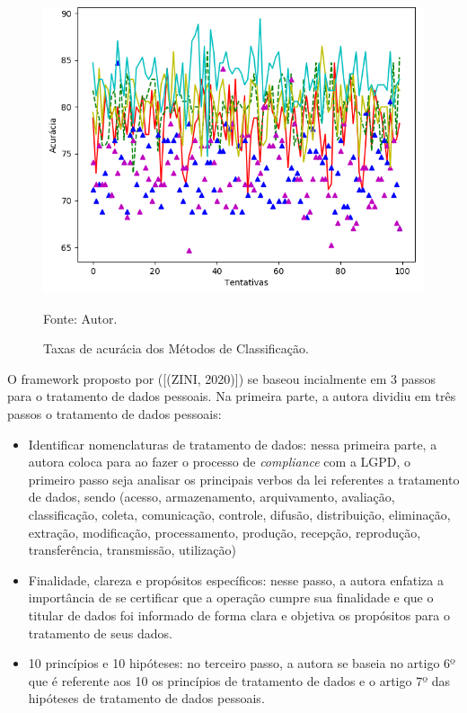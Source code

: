 \documentclass[
	12pt,				%
	openright,			%
	oneside,			%
	a4paper,			%
	english,			%
	french,				%
	spanish,			%
	brazil,				%
	]{abntex2}
\begin{document}
\begin{figure}[ht]
    \centering
    \caption{Taxas de acurácia dos Métodos de Classificação.}
    \includegraphics[width=5.0in]{Images/acc-classification.png}
    \label{fig: grafico-acc}
    
    \centering \small Fonte: Autor.
\end{figure}

O framework proposto por ([(ZINI, 2020)]) se baseou incialmente em 3 passos para o tratamento de dados pessoais. Na primeira parte, a autora dividiu em três passos o tratamento de dados pessoais:

\begin{itemize}
\item Identificar nomenclaturas de tratamento de dados: nessa primeira parte, a autora coloca para ao fazer o processo de \textit{compliance} com a LGPD, o primeiro passo seja analisar os principais verbos da lei referentes a tratamento de dados, sendo (acesso, armazenamento, arquivamento, avaliação, classificação, coleta, comunicação, controle, difusão, distribuição, eliminação, extração, modificação, processamento, produção, recepção, reprodução, transferência, transmissão, utilização)
\item Finalidade, clareza e propósitos específicos: nesse passo, a autora enfatiza a importância de se certificar que a operação cumpre sua finalidade e que o titular de dados foi informado de forma clara e objetiva os propósitos para o tratamento de seus dados.
\item 10 princípios e 10 hipóteses: no terceiro passo, a autora se baseia no artigo 6º que é referente aos 10 os princípios de tratamento de dados e o artigo 7º das hipóteses de tratamento de dados pessoais.
\end{itemize}
\end{document}
